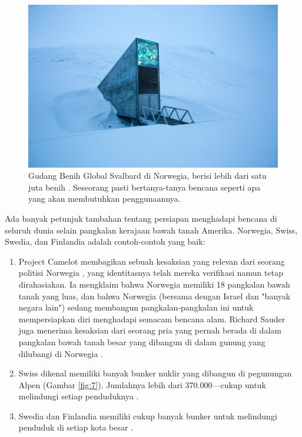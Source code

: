 \documentclass[10pt,twocolumn,letterpaper]{article}
\begin{document}
\begin{figure}[t]
\begin{center}
   \includegraphics[width=1\linewidth]{svalbard.jpg}
\end{center}
   \caption{Gudang Benih Global Svalbard di Norwegia, berisi lebih dari satu juta benih \cite{24}. Seseorang pasti bertanya-tanya bencana seperti apa yang akan membutuhkan penggunaannya.}
\label{fig:8}
\label{fig:onecol}
\end{figure}

Ada banyak petunjuk tambahan tentang persiapan menghadapi bencana di seluruh dunia selain pangkalan kerajaan bawah tanah Amerika. Norwegia, Swiss, Swedia, dan Finlandia adalah contoh-contoh yang baik:
\begin{flushleft}
\begin{enumerate}
    \item Project Camelot membagikan sebuah kesaksian yang relevan dari seorang politisi Norwegia \cite{25,26}, yang identitasnya telah mereka verifikasi namun tetap dirahasiakan. Ia mengklaim bahwa Norwegia memiliki 18 pangkalan bawah tanah yang luas, dan bahwa Norwegia (bersama dengan Israel dan "banyak negara lain") sedang membangun pangkalan-pangkalan ini untuk mempersiapkan diri menghadapi semacam bencana alam. Richard Sauder juga menerima kesaksian dari seorang pria yang pernah berada di dalam pangkalan bawah tanah besar yang dibangun di dalam gunung yang dilubangi di Norwegia \cite{22}.
    \item Swiss dikenal memiliki banyak bunker nuklir yang dibangun di pegunungan Alpen (Gambar \ref{fig:7}). Jumlahnya lebih dari 370.000—cukup untuk melindungi setiap penduduknya \cite{27}.
    \item Swedia dan Finlandia memiliki cukup banyak bunker untuk melindungi penduduk di setiap kota besar \cite{27}. 
\end{enumerate}
\end{flushleft}
\end{document}
